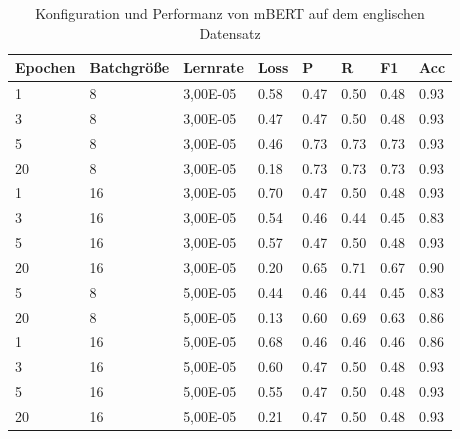 \documentclass[ngerman]{ttlab-qualify}
\begin{document}
\begin{table}[!ht]
    \centering
    \caption{Konfiguration und Performanz von mBERT auf dem englischen Datensatz}
    \begin{tabular}{|l|l|l|l|l|l|l|l|}
    \hline
        \textbf{Epochen} & \textbf{Batchgröße} & \textbf{Lernrate} & \textbf{Loss} & \textbf{P} & \textbf{R} & \textbf{F1} & \textbf{Acc} \\ \hline
        1 & 8 & 3,00E-05 & 0.58 & 0.47 & 0.50 & 0.48 & 0.93 \\ \hline
        3 & 8 & 3,00E-05 & 0.47 & 0.47 & 0.50 & 0.48 & 0.93 \\ \hline
        5 & 8 & 3,00E-05 & 0.46 & 0.73 & 0.73 & 0.73 & 0.93 \\ \hline
        20 & 8 & 3,00E-05 & 0.18 & 0.73 & 0.73 & 0.73 & 0.93 \\ \hline
        1 & 16 & 3,00E-05 & 0.70 & 0.47 & 0.50 & 0.48 & 0.93 \\ \hline
        3 & 16 & 3,00E-05 & 0.54 & 0.46 & 0.44 & 0.45 & 0.83 \\ \hline
        5 & 16 & 3,00E-05 & 0.57 & 0.47 & 0.50 & 0.48 & 0.93 \\ \hline
        20 & 16 & 3,00E-05 & 0.20 & 0.65 & 0.71 & 0.67 & 0.90 \\ \hline
        5 & 8 & 5,00E-05 & 0.44 & 0.46 & 0.44 & 0.45 & 0.83 \\ \hline
        20 & 8 & 5,00E-05 & 0.13 & 0.60 & 0.69 & 0.63 & 0.86 \\ \hline
        1 & 16 & 5,00E-05 & 0.68 & 0.46 & 0.46 & 0.46 & 0.86 \\ \hline
        3 & 16 & 5,00E-05 & 0.60 & 0.47 & 0.50 & 0.48 & 0.93 \\ \hline
        5 & 16 & 5,00E-05 & 0.55 & 0.47 & 0.50 & 0.48 & 0.93 \\ \hline
        20 & 16 & 5,00E-05 & 0.21 & 0.47 & 0.50 & 0.48 & 0.93 \\ \hline
    \end{tabular}
\end{table}
\newpage
\end{document}
